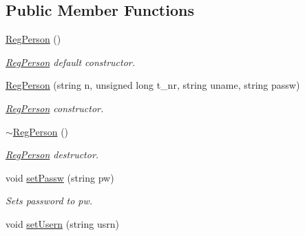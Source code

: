\subsection*{Public Member Functions}
\begin{DoxyCompactItemize}
\item 
\hypertarget{class_reg_person_a607b780b62f25aba32b0b1292949e8d8}{\hyperlink{class_reg_person_a607b780b62f25aba32b0b1292949e8d8}{Reg\+Person} ()}\label{class_reg_person_a607b780b62f25aba32b0b1292949e8d8}

\begin{DoxyCompactList}\small\item\em \hyperlink{class_reg_person}{Reg\+Person} default constructor. \end{DoxyCompactList}\item 
\hyperlink{class_reg_person_aa584be9f308b5f0257817ac9b015c1b4}{Reg\+Person} (string n, unsigned long t\+\_\+nr, string uname, string passw)
\begin{DoxyCompactList}\small\item\em \hyperlink{class_reg_person}{Reg\+Person} constructor. \end{DoxyCompactList}\item 
\hypertarget{class_reg_person_acc2f3a1c7f87cbb947f76642b0208b62}{\hyperlink{class_reg_person_acc2f3a1c7f87cbb947f76642b0208b62}{$\sim$\+Reg\+Person} ()}\label{class_reg_person_acc2f3a1c7f87cbb947f76642b0208b62}

\begin{DoxyCompactList}\small\item\em \hyperlink{class_reg_person}{Reg\+Person} destructor. \end{DoxyCompactList}\item 
\hypertarget{class_reg_person_abd22f72e4d87ce17c58e0b674160285e}{void \hyperlink{class_reg_person_abd22f72e4d87ce17c58e0b674160285e}{set\+Passw} (string pw)}\label{class_reg_person_abd22f72e4d87ce17c58e0b674160285e}

\begin{DoxyCompactList}\small\item\em Sets password to pw. \end{DoxyCompactList}\item 
\hypertarget{class_reg_person_a6a67d8f2dc03110d57f475e17ee330d8}{void \hyperlink{class_reg_person_a6a67d8f2dc03110d57f475e17ee330d8}{set\+Usern} (string usrn)}\label{class_reg_person_a6a67d8f2dc03110d57f475e17ee330d8}


\end{DoxyCompactItemize}
